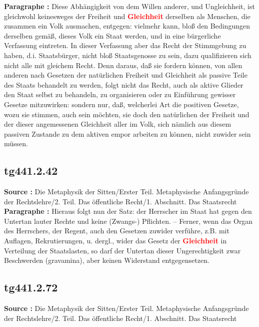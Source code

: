 \documentclass[a4paper,12pt,twoside]{book}
\newcommand{\match}[1]{\textcolor{red}{\textbf{#1}}}
\begin{document}
	\textbf{Paragraphe : }Diese Abhängigkeit von dem Willen anderer, und Ungleichheit, ist gleichwohl keinesweges der Freiheit und \match{Gleichheit} derselben als Menschen, die zusammen ein Volk ausmachen, entgegen: vielmehr kann, bloß den Bedingungen derselben gemäß, dieses Volk ein Staat werden, und in eine bürgerliche Verfassung eintreten. In dieser Verfassung aber das Recht der Stimmgebung zu haben, d.i. Staatsbürger, nicht bloß Staatsgenosse zu sein, dazu qualifizieren sich nicht alle mit gleichem Recht. Denn daraus, daß sie fordern können, von allen anderen nach Gesetzen der natürlichen Freiheit und Gleichheit als passive Teile des Staats behandelt zu werden, folgt nicht das Recht, auch als aktive Glieder den Staat selbst  zu behandeln, zu organisieren oder zu Einführung gewisser Gesetze mitzuwirken: sondern nur, daß, welcherlei Art die positiven Gesetze, wozu sie stimmen, auch sein möchten, sie doch den natürlichen der Freiheit und der dieser angemessenen Gleichheit aller im Volk, sich nämlich aus diesem passiven Zustande zu dem aktiven empor arbeiten zu können, nicht zuwider sein müssen. 
	
	\subsection*{tg441.2.42} 
	\textbf{Source : }Die Metaphysik der Sitten/Erster Teil. Metaphysische Anfangsgründe der Rechtslehre/2. Teil. Das öffentliche Recht/1. Abschnitt. Das Staatsrecht\\  
	
	\textbf{Paragraphe : }Hieraus folgt nun der Satz: der Herrscher im Staat hat gegen den Untertan lauter Rechte und keine (Zwangs-) Pflichten. – Ferner, wenn das Organ des Herrschers, der Regent, auch den Gesetzen zuwider verführe, z.B. mit Auflagen, Rekrutierungen, u. dergl., wider das Gesetz der \match{Gleichheit} in Verteilung der Staatslasten, so darf der Untertan dieser Ungerechtigkeit zwar Beschwerden (gravamina), aber keinen Widerstand entgegensetzen. 
	
	\subsection*{tg441.2.72} 
	\textbf{Source : }Die Metaphysik der Sitten/Erster Teil. Metaphysische Anfangsgründe der Rechtslehre/2. Teil. Das öffentliche Recht/1. Abschnitt. Das Staatsrecht\\  
	
\end{document}
